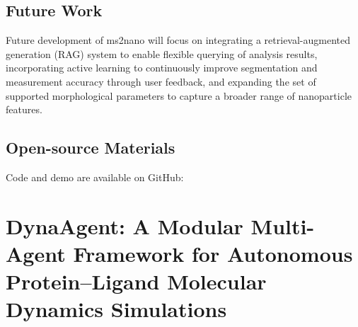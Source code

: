 \subsection*{Future Work}

Future development of ms2nano will focus on integrating a retrieval-augmented generation (RAG) system to enable flexible querying of analysis results, incorporating active learning to continuously improve segmentation and measurement accuracy through user feedback, and expanding the set of supported morphological parameters to capture a broader range of nanoparticle features.

\subsection*{Open-source Materials}

Code and demo are available on GitHub: 








\section{DynaAgent: A Modular Multi-Agent Framework for Autonomous Protein--Ligand Molecular Dynamics Simulations}

%

